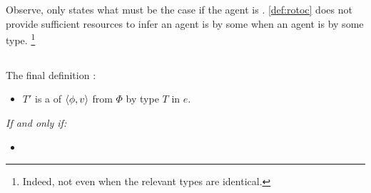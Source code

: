 \begin{note}
  Observe, \rotoc{} only states what must be the case if the agent is \tCV{}.
  \autoref{def:rotoc} does not provide sufficient resources to infer an agent is \tCV{} by some \torN{} when an agent is \ptCV{} by some type.%
  \footnote{
    Indeed, not even when the relevant types are identical.
  }
\end{note}


\subsection{}
\label{sec:rotoc}

\begin{note}
  The final definition :
\end{note}

\begin{note}
  \begin{definition}[A \rotoc{}]
    \label{def:rotoc}
    \newline

    \begin{itemize}
    \item
      \(T'\) is a \emph{\tRep{}} of \vAgent{} \tCV{} \(\langle \phi, v \rangle\) from \(\Phi\) by type \(T\) in \(e\).
    \end{itemize}

    \emph{If and only if:}

    \begin{itemize}
    \item
    \end{itemize}
    \vspace{-.5\baselineskip}
  \end{definition}


\end{note}
